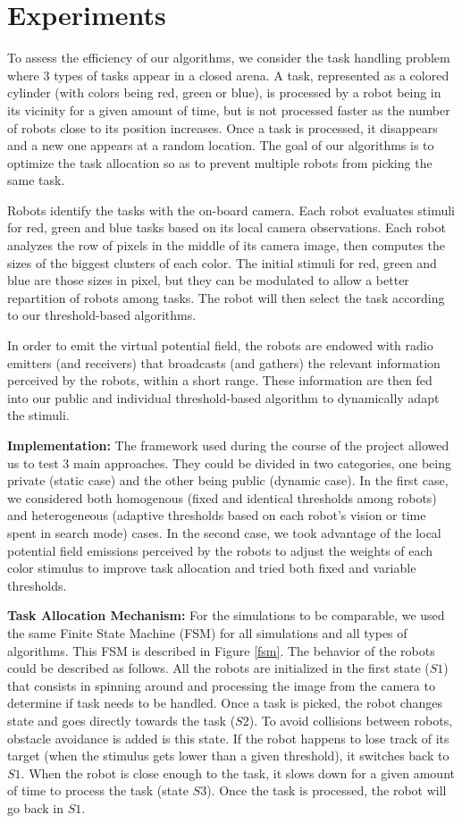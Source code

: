 \section{Experiments}
To assess the efficiency of our algorithms, we consider the task handling problem where 3 types of tasks appear in a closed arena. A task, represented as a colored cylinder (with colors being red, green or blue), is processed by a robot being in its vicinity for a given amount of time, but is not processed faster as the number of robots close to its position increases. Once a task is processed, it disappears and a new one appears at a random location. The goal of our algorithms is to optimize the task allocation so as to prevent multiple robots from picking the same task.

Robots identify the tasks with the on-board camera. Each robot evaluates stimuli for red, green and blue tasks based on its local camera observations. Each robot analyzes the row of pixels in the middle of its camera image, then computes the sizes of the biggest clusters of each color. The initial stimuli for red, green and blue are those sizes in pixel, but they can be modulated to allow a better repartition of robots among tasks. The  robot  will  then select the  task according to our threshold-based algorithms.

In order to emit the virtual potential field, the robots are endowed with radio emitters (and receivers) that broadcasts (and gathers) the relevant information perceived by the robots, within a short range. These information are then fed into our public and individual threshold-based algorithm to dynamically adapt the stimuli.

\textbf{Implementation:}
The framework used during the course of the project allowed us to test 3 main approaches. They could be divided in two categories, one being private (static case) and the other being public (dynamic case). In the first case, we considered both homogenous (fixed and identical thresholds among robots) and heterogeneous (adaptive thresholds based on each robot's vision or time spent in search mode) cases. In the second case, we took advantage of the local potential field emissions perceived by the robots to adjust the weights of each color stimulus to improve task allocation and tried both fixed and variable thresholds.

\textbf{Task Allocation Mechanism:}
For the simulations to be comparable, we used the same Finite State Machine (FSM) for all simulations and all types of algorithms. This FSM is described in Figure \ref{fsm}. The behavior of the robots could be described as follows. All the robots are initialized in the first state ($S1$) that consists in spinning around and processing the image from the camera to determine if task needs to be handled. Once a task is picked, the robot changes state and goes directly towards the task ($S2$). To avoid collisions between robots, obstacle avoidance is added is this state. If the robot happens to lose track of its target (when the stimulus gets lower than a given threshold), it switches back to $S1$. When the robot is close enough to the task, it slows down for a given amount of time to process the task (state $S3$). Once the task is processed, the robot will go back in $S1$.

